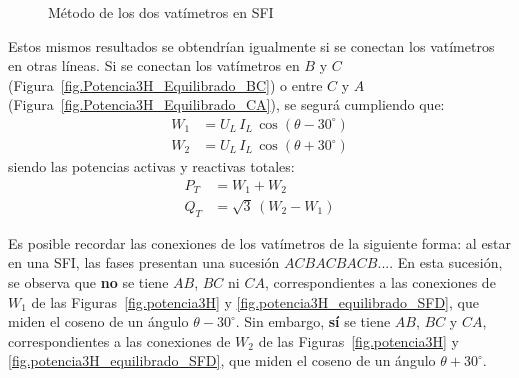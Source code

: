 \documentclass[11pt]{book} %
\begin{document}
\begin{figure}[htbp]
    \centering
    \centering{}\hfill
    \hfill
    \caption{Método de los dos vatímetros en SFI}
    \label{fig.potencia3H_equilibrado_SFI}
\end{figure}

Estos mismos resultados se obtendrían igualmente si se conectan los vatímetros en otras líneas. Si se conectan los vatímetros en $B$ y $C$ (Figura~\ref{fig.Potencia3H_Equilibrado_BC}) o entre $C$ y $A$ (Figura~\ref{fig.Potencia3H_Equilibrado_CA}), se segurá cumpliendo que: 
\begin{align*}
    W_1&=U_L\,I_L\,\cos(\theta-30^\circ) \\
    W_2&=U_L\,I_L\,\cos(\theta+30^\circ)
\end{align*}
siendo las potencias activas y reactivas totales: 
\begin{align*}
    P_T&=W_1 + W_2\\
    Q_T&=\sqrt{3}\,(W_2 - W_1)
\end{align*}

\begin{remark}
    Es posible recordar las conexiones de los vatímetros de la siguiente forma: al estar en una SFI, las fases presentan una sucesión $ACBACBACB$.... En esta sucesión, se observa que {\color{red}\textbf{no}} se tiene $AB$, $BC$ ni $CA$, correspondientes a las conexiones de $W_1$ de las Figuras~\ref{fig.potencia3H} y \ref{fig.potencia3H_equilibrado_SFD}, que miden el coseno de un ángulo $\theta-30^\circ$. Sin embargo, {\color{red}\textbf{sí}} se tiene $AB$, $BC$ y $CA$, correspondientes a las conexiones de $W_2$ de las Figuras~\ref{fig.potencia3H} y \ref{fig.potencia3H_equilibrado_SFD}, que miden el coseno de un ángulo $\theta+30^\circ$.
\end{remark}
\end{document}
